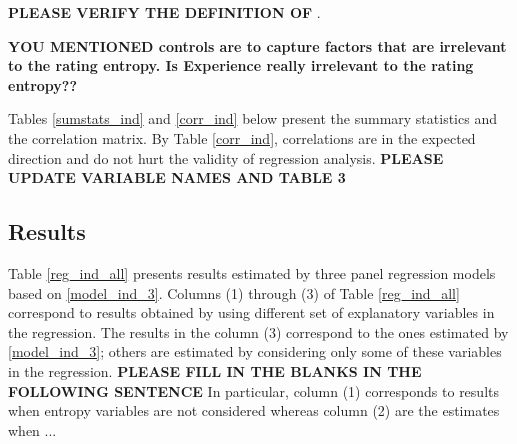 \documentclass[msom,blindrev]{informs3}
\begin{document}
 \textbf{PLEASE VERIFY THE DEFINITION OF }.


\textbf{YOU MENTIONED controls are to capture factors that are irrelevant to the rating entropy. Is Experience really irrelevant to the rating entropy??}



%

Tables \ref{sumstats_ind} and \ref{corr_ind} below present the summary statistics and the correlation matrix. By Table \ref{corr_ind}, correlations are in the expected direction and do not hurt the validity of regression analysis.
\textbf{PLEASE UPDATE VARIABLE NAMES AND TABLE 3}




\subsection{Results}

Table \ref{reg_ind_all} presents results estimated by three panel regression models based on \eqref{model_ind_3}. Columns (1) through (3) of Table \ref{reg_ind_all} correspond to results obtained by using different set of explanatory variables in the regression. The results in the column (3) correspond to the ones estimated by \eqref{model_ind_3}; others are estimated by considering only some of these variables in the regression. \textbf{PLEASE FILL IN THE BLANKS IN THE FOLLOWING SENTENCE} In particular, column (1) corresponds to results when entropy variables are not considered whereas column (2) are the estimates when ...



\end{document}
